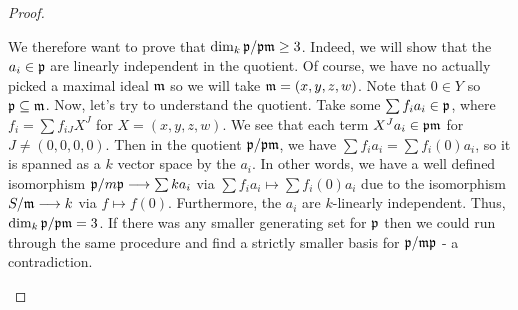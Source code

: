 \begin{proof}
\begin{enumerate}[label = (\alph*)]
        We therefore want to prove that $\dim_k \mathfrak p / \mathfrak p \mathfrak m \geq 3$. Indeed, we will show that the $a_i \in \mathfrak p$ are linearly independent in the quotient. Of course, we have no actually picked a maximal ideal $\mathfrak m$ so we will take $\mathfrak m = (x, y, z, w)$. Note that $0 \in Y$ so $\mathfrak p \subseteq \mathfrak m$. Now, let's try to understand the quotient. Take some $\sum f_i a_i \in \mathfrak p$, where $f_i = \sum f_{iJ} X^J$ for $X = (x, y, z, w)$. We see that each term $X^J a_i \in \mathfrak p \mathfrak m$ for $J \neq (0, 0, 0, 0)$. Then in the quotient $\mathfrak p / \mathfrak p \mathfrak m$, we have $\sum f_i a_i = \sum f_i(0) a_i$, so it is spanned as a $k$ vector space by the $a_i$. In other words, we have a well defined isomorphism $\mathfrak p / m \mathfrak p \longrightarrow \sum k a_i$ via $\sum f_i a_i \mapsto \sum f_i(0) a_i$ due to the isomorphism $S/\mathfrak m \longrightarrow k$ via $f \mapsto f(0)$. Furthermore, the $a_i$ are $k$-linearly independent. Thus, $\dim_k \mathfrak p / \mathfrak p \mathfrak m = 3$. If there was any smaller generating set for $\mathfrak p$ then we could run through the same procedure and find a strictly smaller basis for $\mathfrak p / \mathfrak m \mathfrak p$ - a contradiction.
    \end{enumerate}
\end{proof}
